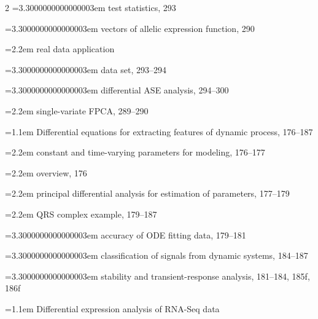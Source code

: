 \begin{multicols}{2}
\noindent\hangindent=3.3000000000000003em \hspace*{2.2em}test statistics, 293\par
\noindent\hangindent=3.3000000000000003em \hspace*{2.2em}vectors of allelic expression function, 290\par
\noindent\hangindent=2.2em \hspace*{1.1em}real data application\par
\noindent\hangindent=3.3000000000000003em \hspace*{2.2em}data set, 293--294\par
\noindent\hangindent=3.3000000000000003em \hspace*{2.2em}differential ASE analysis, 294--300\par
\noindent\hangindent=2.2em \hspace*{1.1em}single-variate FPCA, 289--290\par
\noindent\hangindent=1.1em Differential equations for extracting features of dynamic process, 176--187\par
\noindent\hangindent=2.2em \hspace*{1.1em}constant and time-varying parameters for modeling, 176--177\par
\noindent\hangindent=2.2em \hspace*{1.1em}overview, 176\par
\noindent\hangindent=2.2em \hspace*{1.1em}principal differential analysis for estimation of parameters, 177--179\par
\noindent\hangindent=2.2em \hspace*{1.1em}QRS complex example, 179--187\par
\noindent\hangindent=3.3000000000000003em \hspace*{2.2em}accuracy of ODE fitting data, 179--181\par
\noindent\hangindent=3.3000000000000003em \hspace*{2.2em}classification of signals from dynamic systems, 184--187\par
\noindent\hangindent=3.3000000000000003em \hspace*{2.2em}stability and transient-response analysis, 181--184, 185f, 186f\par
\noindent\hangindent=1.1em Differential expression analysis of RNA-Seq data\par

\end{multicols}
